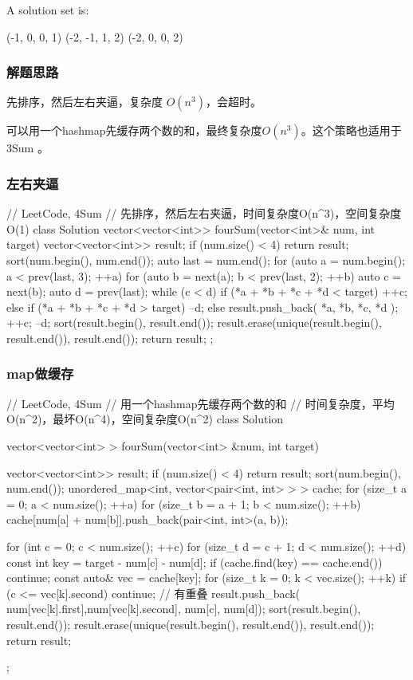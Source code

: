 A solution set is:
\begin{Code}
	(-1,  0, 0, 1)
	(-2, -1, 1, 2)
	(-2,  0, 0, 2)
\end{Code}


\subsubsection{解题思路}
先排序，然后左右夹逼，复杂度 $O(n^3)$，会超时。

可以用一个hashmap先缓存两个数的和，最终复杂度$O(n^3)$。这个策略也适用于 3Sum 。


\subsubsection{左右夹逼}
\begin{Code}
	// LeetCode, 4Sum
	// 先排序，然后左右夹逼，时间复杂度O(n^3)，空间复杂度O(1)
	class Solution {
		vector<vector<int>> fourSum(vector<int>& num, int target) {
			vector<vector<int>> result;
			if (num.size() < 4) return result;
			sort(num.begin(), num.end());
			auto last = num.end();
			for (auto a = num.begin(); a < prev(last, 3); ++a) {
				for (auto b = next(a); b < prev(last, 2); ++b) {
					auto c = next(b);
					auto d = prev(last);
					while (c < d) {
						if (*a + *b + *c + *d < target) {
							++c;
						} else if (*a + *b + *c + *d > target) {
							--d;
						} else {
							result.push_back({ *a, *b, *c, *d });
							++c;
							--d;
						}
					}
				}
			}
			sort(result.begin(), result.end());
			result.erase(unique(result.begin(), result.end()), result.end());
			return result;
		}
	};
\end{Code}


\subsubsection{map做缓存}
\begin{Code}
	// LeetCode, 4Sum
	// 用一个hashmap先缓存两个数的和
	// 时间复杂度，平均O(n^2)，最坏O(n^4)，空间复杂度O(n^2)
	class Solution {
		vector<vector<int> > fourSum(vector<int> &num, int target) {
			vector<vector<int>> result;
			if (num.size() < 4) return result;
			sort(num.begin(), num.end());
			unordered_map<int, vector<pair<int, int> > > cache;
			for (size_t a = 0; a < num.size(); ++a) {
				for (size_t b = a + 1; b < num.size(); ++b) 
					cache[num[a] + num[b]].push_back(pair<int, int>(a, b));
			}
			
			for (int c = 0; c < num.size(); ++c) {
				for (size_t d = c + 1; d < num.size(); ++d) {
					const int key = target - num[c] - num[d];
					if (cache.find(key) == cache.end()) continue;
					const auto& vec = cache[key];
					for (size_t k = 0; k < vec.size(); ++k) {
						if (c <= vec[k].second)
						continue; // 有重叠
						result.push_back( {num[vec[k].first],num[vec[k].second], num[c], num[d]});
					}
				}
			}
			sort(result.begin(), result.end());
			result.erase(unique(result.begin(), result.end()), result.end());
			return result;
		}
	};
\end{Code}


